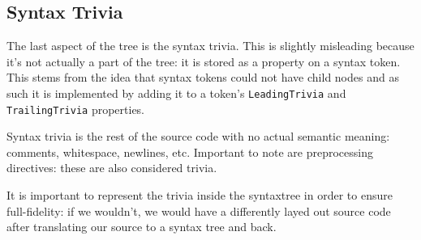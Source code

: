 \subsection{Syntax Trivia}
\label{sec:syntax-trivia}

The last aspect of the tree is the syntax trivia. This is slightly misleading because it's not actually a part of the tree: it is stored as a property on a syntax token. This stems from the idea that syntax tokens could not have child nodes and as such it is implemented by adding it to a token's \texttt{LeadingTrivia} and \texttt{TrailingTrivia} properties. 

Syntax trivia is the rest of the source code with no actual semantic meaning: comments, whitespace, newlines, etc. Important to note are preprocessing directives: these are also considered trivia.

It is important to represent the trivia inside the \gls{syntaxtree} in order to ensure full-fidelity: if we wouldn't, we would have a differently layed out source code after translating our source to a syntax tree and back.




